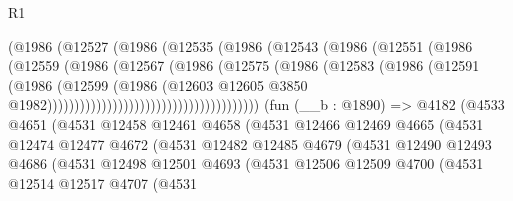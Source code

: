 \begin{lexlean}{R1}
\begin{coremodule}
                                      (@1986
                                        (@12527
                                          (@1986
                                            (@12535
                                              (@1986
                                                (@12543
                                                  (@1986
                                                    (@12551
                                                      (@1986
                                                        (@12559
                                                          (@1986
                                                            (@12567
                                                              (@1986
                                                                (@12575
                                                                  (@1986
                                                                    (@12583
                                                                      (@1986
                                                                        (@12591
                                                                          (@1986
                                                                            (@12599
                                                                              (@1986
                                                                                (@12603
                                                                                  @12605
                                                                                  @3850
                                                                                  @1982)))))))))))))))))))))))))))))))))))))))
    (fun (__b : @1890) =>
    @4182
      (@4533
        @4651
        (@4531
          @12458
          @12461
          @4658
          (@4531
            @12466
            @12469
            @4665
            (@4531
              @12474
              @12477
              @4672
              (@4531
                @12482
                @12485
                @4679
                (@4531
                  @12490
                  @12493
                  @4686
                  (@4531
                    @12498
                    @12501
                    @4693
                    (@4531
                      @12506
                      @12509
                      @4700
                      (@4531
                        @12514
                        @12517
                        @4707
                        (@4531

\end{coremodule}
\end{lexlean}
